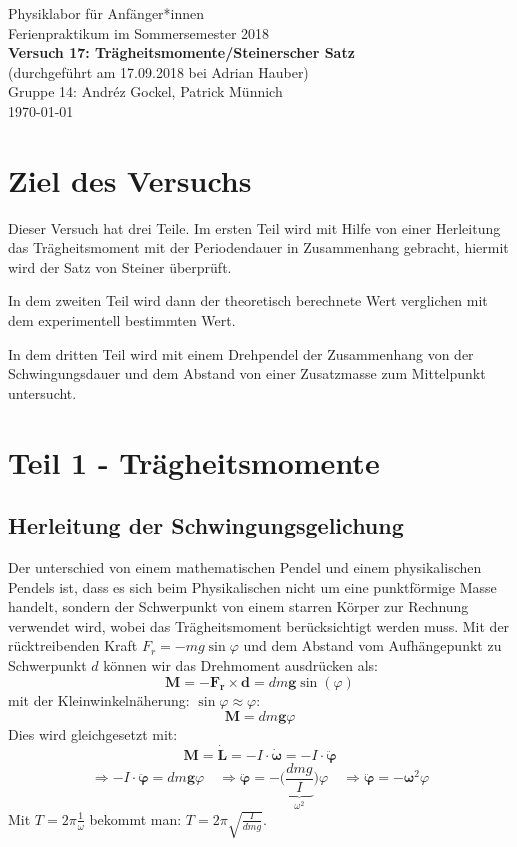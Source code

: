 \documentclass[11pt,a4paper]{article}
\renewcommand{\vec}{\boldsymbol}
\begin{document}
{
\centering 
\large 
Physiklabor für Anf\"anger*innen \\
Ferienpraktikum im Sommersemester 2018 \\[4mm]
\textbf{\LARGE 
Versuch 17: Trägheitsmomente/Steinerscher Satz
} \\[3mm]
(durchgef\"uhrt am 17.09.2018 bei Adrian Hauber)\\
Gruppe 14: Andréz Gockel, Patrick M\"unnich\\ 
\today \\[10mm]
}
\vfill
\tableofcontents
\vfill
\pagebreak

\section{Ziel des Versuchs}

Dieser Versuch hat drei Teile. Im ersten Teil wird mit Hilfe von einer Herleitung das Trägheitsmoment mit der Periodendauer in Zusammenhang gebracht, hiermit wird der Satz von Steiner überprüft.  

In dem zweiten Teil wird dann der theoretisch berechnete Wert verglichen mit dem experimentell bestimmten Wert. 

In dem dritten Teil wird mit einem Drehpendel der Zusammenhang von der Schwingungsdauer und dem Abstand von einer Zusatzmasse zum Mittelpunkt untersucht.
\section{Teil 1 - Trägheitsmomente}
\subsection{Herleitung der Schwingungsgelichung}

Der unterschied von einem mathematischen Pendel und einem physikalischen Pendels ist, dass es sich beim Physikalischen nicht um eine punktförmige Masse handelt, sondern der Schwerpunkt von einem starren Körper zur Rechnung verwendet wird, wobei das Trägheitsmoment berücksichtigt werden muss. Mit der rücktreibenden Kraft $F_r = -mg\sin\varphi$ und dem Abstand vom Aufhängepunkt zu Schwerpunkt $d$ können wir das Drehmoment ausdrücken als:
$$\vec{M} = -\vec{F_r} \times \vec{d} = dm\vec{g}\sin(\varphi)$$
mit der Kleinwinkelnäherung: $\sin\varphi \approx \varphi$:
$$\vec{M} = dm\vec{g}\varphi$$
Dies wird gleichgesetzt mit:
$$\vec{M} = \vec{\dot L} = - I \cdot \vec{\dot\omega} = - I \cdot \vec{\ddot\varphi}$$
$$\Rightarrow - I \cdot \vec{\ddot\varphi} = dm\vec{g}\varphi \quad \Rightarrow \vec{\ddot\varphi} = - \bigg(\underbrace{\frac{dmg}{I}}_{\omega^2}\bigg)\varphi \quad \Rightarrow \vec{\ddot\varphi} = - \vec\omega^2 \varphi$$
Mit $T = 2\pi \frac{1}{\omega}$ bekommt man: $T = 2\pi \sqrt{\frac{I}{dmg}}$.
\end{document}
